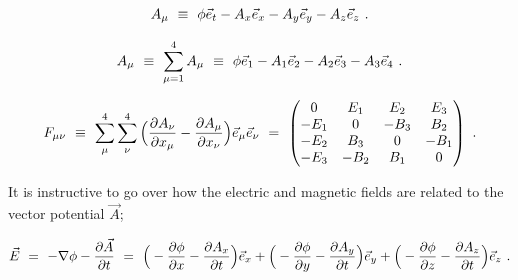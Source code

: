 \documentclass{article}
\begin{document}
\begin{equation} \label{eb-eq-1002-16}
A_{\mu} \hspace{0.125cm} \equiv \hspace{0.125cm} \phi \vec{e}_t - A_x \vec{e}_x - A_y \vec{e}_y - A_z \vec{e}_z \hspace{0.125cm} .
\end{equation}

\begin{equation} \label{eb-eq-1002-17}
A_{\mu} \hspace{0.125cm} \equiv \hspace{0.125cm} \sum_{\mu = 1}^{4} A_{\mu} \hspace{0.125cm} \equiv \hspace{0.125cm} \phi \vec{e}_1 - A_1 \vec{e}_2 - A_2 \vec{e}_3 - A_3 \vec{e}_4 \hspace{0.125cm} .
\end{equation}

\begin{equation} \label{eb-eq-1002-18}
F_{\mu \nu} \hspace{0.125cm} \equiv \hspace{0.125cm}  \sum_{\mu}^{4} \sum_{\nu}^{4} \Big( \frac{\partial{A_{\nu}}}{\partial{x_{\mu}}} - \frac{\partial{A_{\mu}}}{\partial{x_{\nu}}} \Big) \vec{e}_{\mu} \vec{e}_{\nu} \hspace{0.125cm} = \hspace{0.125cm} \begin{pmatrix} 0 & E_1 & E_2 & E_3 \\ -E_1 & 0 & -B_3 & B_2 \\ -E_2 & B_3 & 0 & -B_1 \\ -E_3 & -B_2 & B_1 & 0 \end{pmatrix} \hspace{0.125cm} .
\end{equation}

It is instructive to go over how the electric and magnetic fields are related to the vector potential \begin{math} \vec{A} \end{math};

\begin{equation} \label{eb-eq-1002-19}
\vec{E} \hspace{0.125cm} = \hspace{0.125cm} - \nabla{\phi} - \frac{\partial{\vec{A}}}{\partial{t}} \hspace{0.125cm} = \hspace{0.125cm} \Big( - \frac{\partial{\phi}}{\partial{x}} - \frac{\partial{A_x}}{\partial{t}} \Big) \vec{e}_x + \Big( - \frac{\partial{\phi}}{\partial{y}} - \frac{\partial{A_y}}{\partial{t}} \Big) \vec{e}_y + \Big( - \frac{\partial{\phi}}{\partial{z}} - \frac{\partial{A_z}}{\partial{t}} \Big) \vec{e}_z \hspace{0.125cm} .
\end{equation}
\end{document}
